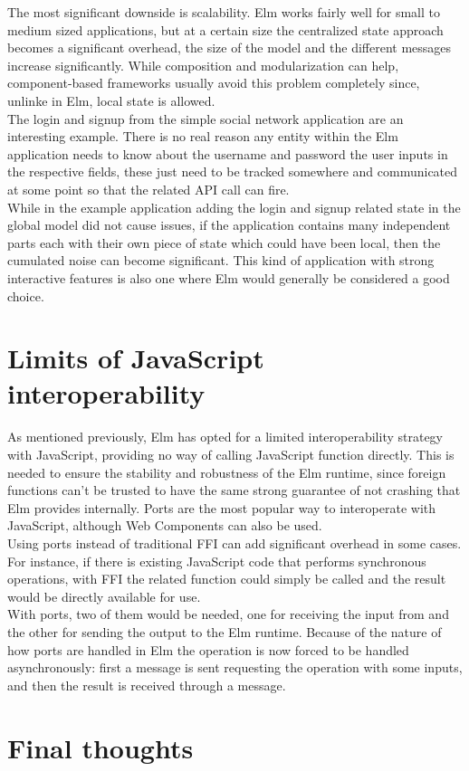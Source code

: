 The most significant downside is scalability. Elm works fairly well for small to medium sized applications, but at a certain size the centralized state approach becomes a significant overhead, the size of the model and the different messages increase significantly. While composition and modularization can help, component-based frameworks usually avoid this problem completely since, unlinke in Elm, local state is allowed.\\

The login and signup from the simple social network application are an interesting example. There is no real reason any entity within the Elm application needs to know about the username and password the user inputs in the respective fields, these just need to be tracked somewhere and communicated at some point so that the related API call can fire.\\

While in the example application adding the login and signup related state in the global model did not cause issues, if the application contains many independent parts each with their own piece of state which could have been local, then the cumulated noise can become significant. This kind of application with strong interactive features is also one where Elm would generally be considered a good choice.

\section{Limits of JavaScript interoperability}

As mentioned previously, Elm has opted for a limited interoperability strategy with JavaScript, providing no way of calling JavaScript function directly. This is needed to ensure the stability and robustness of the Elm runtime, since foreign functions can't be trusted to have the same strong guarantee of not crashing that Elm provides internally. Ports are the most popular way to interoperate with JavaScript, although Web Components can also be used.\\

Using ports instead of traditional FFI can add significant overhead in some cases. For instance, if there is existing JavaScript code that performs synchronous operations, with FFI the related function could simply be called and the result would be directly available for use.\\
With ports, two of them would be needed, one for receiving the input from and the other for sending the output to the Elm runtime. Because of the nature of how ports are handled in Elm the operation is now forced to be handled asynchronously: first a message is sent requesting the operation with some inputs, and then the result is received through a message.

\section{Final thoughts}
